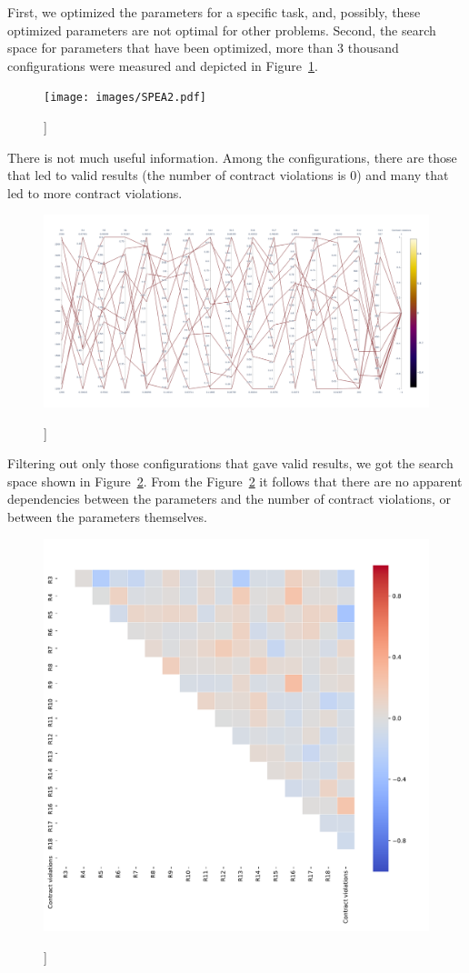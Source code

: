 First, we optimized the parameters for a specific task, and, possibly, these optimized parameters are not optimal for other problems.
Second, the search space for parameters that have been optimized, more than 3 thousand configurations were measured and depicted in Figure~\ref{fig:SearchSpaceViewFull}.
\begin{figure}
	\centering
	\texttt{[image: images/SPEA2.pdf]}
	\caption[]]{}
	\label{fig:SearchSpaceViewFull}
\end{figure}
There is not much useful information. Among the configurations, there are those that led to valid results (the number of contract violations is 0) and many that led to more contract violations.
\begin{figure}
	\centering
	\includegraphics[width=\textwidth]{images/SPEA2_Zero_validity.html.pdf}
	\caption[]]{}
	\label{fig:SearchSpaceValid}
\end{figure}
Filtering out only those configurations that gave valid results, we got the search space shown in Figure~\ref{fig:SearchSpaceValid}. From the Figure~\ref{fig:SearchSpaceValid} it follows that there are no apparent dependencies between the parameters and the number of contract violations, or between the parameters themselves.
\begin{figure}
	\centering
	\includegraphics[width=\textwidth]{images/CorrelationAnalysis.pdf}
	\caption[]]{}
	\label{fig:CorrelationAnalysis}
\end{figure}

